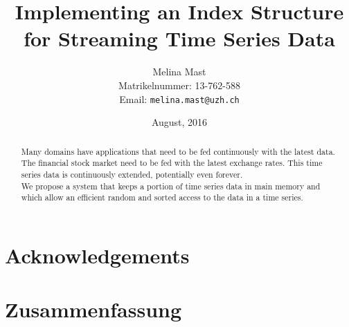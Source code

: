 \documentclass[abstracton,12pt]{scrreprt}
\title{Implementing an Index Structure for Streaming Time Series Data}
\author{
  Melina Mast\\[-5pt]
  \scriptsize Matrikelnummer: 13-762-588\\[-5pt]
  \scriptsize Email: \texttt{melina.mast@uzh.ch}
}
\date{\vspace*{2cm}August, 2016}
\begin{document}
\maketitle

\chapter*{Acknowledgements}



\begin{abstract}
Many domains have applications that need to be fed continuously with the latest data. The financial stock market need to be fed with the latest exchange rates. This time series data is continuously extended, potentially even forever.\\
We propose a system that keeps a portion of time series data in main memory and which allow an efficient random and sorted access to the data in a time series. 
\end{abstract}

\chapter*{Zusammenfassung}

\tableofcontents
\listoffigures
\listoftables
\listofalgorithms
\renewcommand{\lstlistingname}{Algorithm}%


\end{document}
